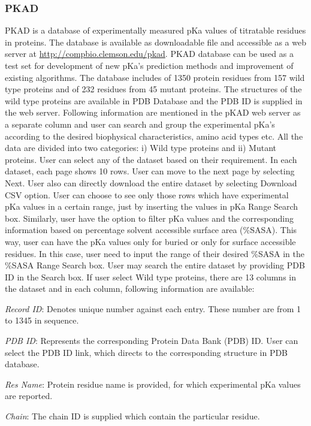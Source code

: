 \documentclass[9pt,tutorial]{livecoms}
\begin{document}
\subsubsection{PKAD}
PKAD is a database of experimentally measured pKa values of titratable residues in proteins. The database\cite{pahari2019pkad} is available as downloadable file and accessible as a web server at \url{http://compbio.clemson.edu/pkad}. PKAD database can be used as a test set for development of new pKa’s prediction methods and improvement of existing algorithms. The database includes of 1350 protein residues from 157 wild type proteins and of 232 residues from 45 mutant proteins. The structures of the wild type proteins are available in PDB Database and the PDB ID is supplied in the web server. Following information are mentioned in the pKAD web server as a separate column and user can search and group the experimental pKa’s according to the desired biophysical characteristics, amino acid types etc. All the data are divided into two categories: i) Wild type proteins and ii) Mutant proteins. User can select any of the dataset based on their requirement. In each dataset, each page shows 10 rows. User can move to the next page by selecting Next. User also can directly download the entire dataset by selecting Download CSV option. User can choose to see only those rows which have experimental pKa values in a certain range, just by inserting the values in pKa Range Search box. Similarly, user have the option to filter pKa values and the corresponding information based on percentage solvent accessible surface area (\%SASA). This way, user can have the pKa values only for buried or only for surface accessible residues. In this case, user need to input the range of their desired \%SASA in the \%SASA Range Search box. User may search the entire dataset by providing PDB ID in the Search box. If user select Wild type proteins, there are 13 columns in the dataset and in each column, following information are available:

\textit{Record ID}: Denotes unique number against each entry. These number are from 1 to 1345 in sequence.

\textit{PDB ID}: Represents the corresponding Protein Data Bank (PDB) ID. User can select the PDB ID link, which directs to the corresponding structure in PDB database. 

\textit{Res Name}: Protein residue name is provided, for which experimental pKa values are reported.

\textit{Chain}: The chain ID is supplied which contain the particular residue.
\end{document}
